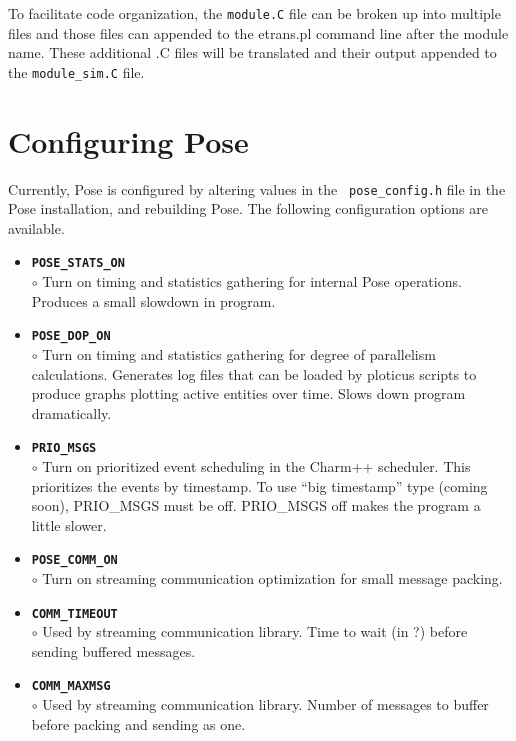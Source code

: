 \documentclass[10pt]{article}
\newcommand{\pose}{{\sc Pose}}
\begin{document}
To facilitate code organization, the {\tt module.C} file can be broken up into multiple files and those files can appended to the {etrans.pl} command line after the module name.  These additional .C files will be translated and their output appended to the {\tt module\_sim.C} file.  


\section{Configuring \pose{}}

Currently, \pose{} is configured by altering values in the {\tt
pose\_config.h} file in the \pose{} installation, and rebuilding
\pose{}.  The following configuration options are available.

\begin{itemize}
\item {\tt {\bf POSE\_STATS\_ON}}\\
	$\circ$ Turn on timing and statistics gathering for internal \pose{}
	operations.  Produces a small slowdown in program.\\
\item {\tt {\bf POSE\_DOP\_ON}}\\
	$\circ$ Turn on timing and statistics gathering for degree of parallelism calculations.  Generates log files that can be loaded by ploticus scripts to produce graphs plotting active entities over time.  Slows down program dramatically.\\
\item {\tt {\bf PRIO\_MSGS}}\\ $\circ$ Turn on prioritized event
	scheduling in the Charm++ scheduler.  This prioritizes the
	events by timestamp.  To use ``big timestamp'' type (coming
	soon), PRIO\_MSGS must be off.  PRIO\_MSGS off makes the program
	a little slower.\\
\item {\tt {\bf POSE\_COMM\_ON}}\\
	$\circ$ Turn on streaming communication optimization for small message packing.\\
\item {\tt {\bf COMM\_TIMEOUT}}\\
	$\circ$ Used by streaming communication library. Time to wait (in ?) before sending buffered messages.\\
\item {\tt {\bf COMM\_MAXMSG}}\\
	$\circ$ Used by streaming communication library.  Number of messages to buffer before packing and sending as one.\\

\end{itemize}
\end{document}
